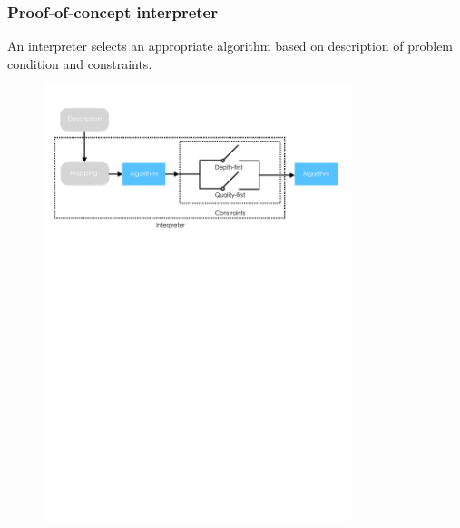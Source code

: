 \documentclass{beamer}
\begin{document}
\begin{frame}
\frametitle{Proof-of-concept interpreter}

An interpreter selects an appropriate algorithm based on description of problem condition and constraints.

\begin{figure}[!htbp]
\centering
\includegraphics[width=0.8\textwidth]{interp/interpreter.pdf}
\end{figure}

\end{frame}
\end{document}

